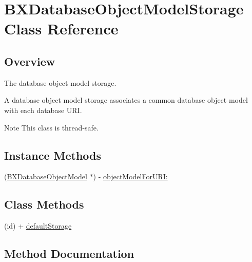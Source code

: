 \hypertarget{interface_b_x_database_object_model_storage}{}\section{B\+X\+Database\+Object\+Model\+Storage Class Reference}
\label{interface_b_x_database_object_model_storage}


\subsection{Overview}
The database object model storage. 

A database object model storage associates a common database object model with each database U\+R\+I.

\begin{DoxyNote}{Note}
This class is thread-\/safe. 
\end{DoxyNote}
\subsection*{Instance Methods}
\begin{DoxyCompactItemize}
\item 
(\hyperlink{interface_b_x_database_object_model}{B\+X\+Database\+Object\+Model} $\ast$) -\/ \hyperlink{interface_b_x_database_object_model_storage_a1df7737072a379ffb781525046a266c9}{object\+Model\+For\+U\+R\+I\+:}
\end{DoxyCompactItemize}
\subsection*{Class Methods}
\begin{DoxyCompactItemize}
\item 
\hypertarget{interface_b_x_database_object_model_storage_a8179ec92744bedaaf4c17282d6d819f6}{}(id) + \hyperlink{interface_b_x_database_object_model_storage_a8179ec92744bedaaf4c17282d6d819f6}{default\+Storage}\label{interface_b_x_database_object_model_storage_a8179ec92744bedaaf4c17282d6d819f6}

\end{DoxyCompactItemize}


\subsection{Method Documentation}
\hypertarget{interface_b_x_database_object_model_storage_a1df7737072a379ffb781525046a266c9}{}
